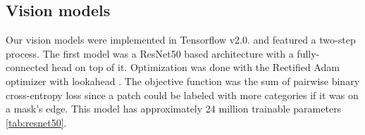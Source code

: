 \documentclass[a4paper,12pt]{article}
\begin{document}
\subsection{Vision models}

\vspace{7mm}

\par Our vision models were implemented in Tensorflow v2.0. and featured a two-step process. The first model was a ResNet50 based architecture \cite{he2016deep} with a fully-connected head on top of it. Optimization was done with the Rectified Adam optimizer \cite{liu2019variance} with lookahead \cite{zhang2019lookahead}. The objective function was the sum of pairwise binary cross-entropy loss since a patch could be labeled with more categories if it was on a mask's edge. This model has approximately 24 million trainable parameters \ref{tab:resnet50}.

\vspace{4mm}
\end{document}
